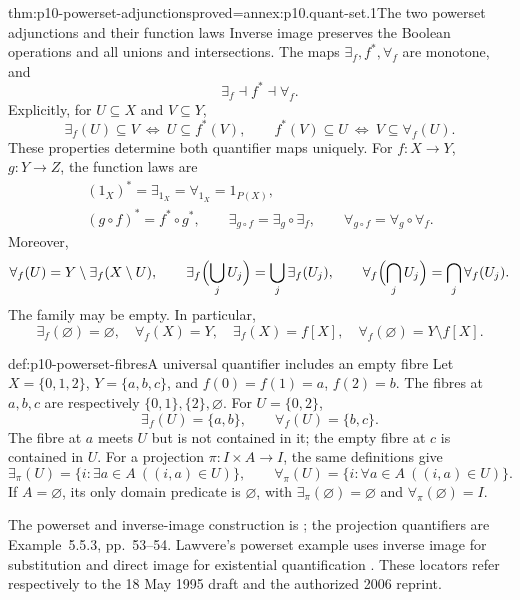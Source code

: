 \begin{hbtheorem}{thm:p10-powerset-adjunctions}{proved=annex:p10.quant-set.1}{The two powerset adjunctions and their function laws}
Inverse image preserves the Boolean operations and all unions
and intersections.  The maps \(\exists_f,f^*,\forall_f\) are
monotone, and
\[
                      \exists_f\dashv f^*\dashv\forall_f.
\]
Explicitly, for \(U\subseteq X\) and \(V\subseteq Y\),
\[
 \exists_f(U)\subseteq V\ \Longleftrightarrow\ U\subseteq f^*(V),
 \qquad
 f^*(V)\subseteq U\ \Longleftrightarrow\ V\subseteq\forall_f(U).
\]
These properties determine both quantifier maps uniquely.
For \(f:X\to Y\), \(g:Y\to Z\), the function laws are
\[
\begin{gathered}
 (1_X)^*=\exists_{1_X}=\forall_{1_X}=1_{P(X)},\\
 (g\circ f)^*=f^*\circ g^*,\qquad
 \exists_{g\circ f}=\exists_g\circ\exists_f,\qquad
 \forall_{g\circ f}=\forall_g\circ\forall_f .
\end{gathered}
\]
Moreover,
\[
 \forall_f(U)=Y\setminus\exists_f(X\setminus U),\qquad
 \exists_f\Bigl(\bigcup_j U_j\Bigr)=\bigcup_j\exists_f(U_j),\qquad
 \forall_f\Bigl(\bigcap_j U_j\Bigr)=\bigcap_j\forall_f(U_j).
\]
The family may be empty.  In particular,
\[
 \exists_f(\varnothing)=\varnothing,\quad
 \forall_f(X)=Y,\quad
 \exists_f(X)=f[X],\quad
 \forall_f(\varnothing)=Y\setminus f[X].
\]
\end{hbtheorem}

\begin{hbexample}{def:p10-powerset-fibres}{A universal quantifier includes an empty fibre}
Let \(X=\{0,1,2\}\), \(Y=\{a,b,c\}\), and
\(f(0)=f(1)=a\), \(f(2)=b\).
The fibres at \(a,b,c\) are respectively \(\{0,1\},\{2\},\varnothing\).
For \(U=\{0,2\}\),
\[
                    \exists_f(U)=\{a,b\},\qquad
                    \forall_f(U)=\{b,c\}.
\]
The fibre at \(a\) meets \(U\) but is not contained in it;
the empty fibre at \(c\) is contained in \(U\).
For a projection \(\pi:I\times A\to I\), the same definitions give
\[
 \exists_\pi(U)=\{i:\exists a\in A\ ((i,a)\in U)\},\qquad
 \forall_\pi(U)=\{i:\forall a\in A\ ((i,a)\in U)\}.
\]
If \(A=\varnothing\), its only domain predicate is
\(\varnothing\), with
\(\exists_\pi(\varnothing)=\varnothing\) and
\(\forall_\pi(\varnothing)=I\).
\end{hbexample}

The powerset and inverse-image construction is
\cite[Example~5.2.2, p.~42]{Pitts1995Draft};
the projection quantifiers are Example~5.5.3, pp.~53--54.
Lawvere's powerset example uses inverse image for substitution
and direct image for existential quantification
\cite[p.~13]{Lawvere2006AdjointnessReprint}.
These locators refer respectively to the 18 May 1995 draft
and the authorized 2006 reprint.

